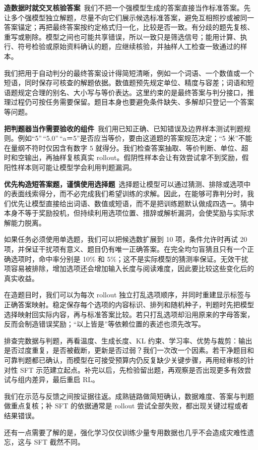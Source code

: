 \textbf{造数据时就交叉核验答案}~我们不把一个强模型生成的答案直接当作标准答案。先让多个强模型独立解题，尽量不向它们展示候选标准答案，避免互相照抄或被同一答案锚定；再把最终答案按约定格式归一化，比较是否一致。有分歧的题先复核、重写或剔除。模型之间也可能共享错误，所以一致只是筛选信号；能用计算、执行、符号检验或原始资料确认的题，应继续核验，并抽样人工检查一致通过的样本。

我们把用于自动判分的最终答案设计得简短清晰，例如一个词语、一个数值或一个短语，同时保存可核查的解题依据。数值题预先规定单位、精度与容差；词语和短语题规定合理的别名、大小写与等价表达。这里约束的是最终答案与判分接口，推理过程仍可按任务需要保留。题目本身也要避免条件缺失、多解却只登记一个答案等问题。

\textbf{把判题器当作需要验收的组件}~我们用已知正确、已知错误及边界样本测试判题规则。例如``5''\,``5.0''\,``a＝5''是否应当等价，要由这道题的答案规范决定；``5 米''不能在量纲不符时仅因含有数字 5 就得分。我们检查答案抽取、等价判断、单位、超时和空输出，再抽样复核真实 rollout。假阴性样本会让有效尝试拿不到奖励，假阳性样本则可能让模型学会利用判题漏洞。

\textbf{优先构造短答案题，谨慎使用选择题}~选择题让模型可以通过猜测、排除或选项中的表面线索得分，而不必完成我们希望训练的求解。因此，在能够可靠判分时，我们优先让模型直接给出词语、数值或短语，而不是把训练题默认做成四选一。猜中本身不等于奖励投机，但持续利用选项位置、措辞或解析漏洞，会使奖励与实际求解能力脱离。

如果任务必须使用单选题，我们可以把候选数扩展到 10 项，条件允许时再试 20 项，并保证干扰项有意义、题目仍有唯一正确答案。在完全均匀盲猜且只有一个正确选项时，命中率分别是 10\% 和 5\%；这不是实际模型的猜测率保证。无效干扰项容易被排除，增加选项还会增加输入长度与阅读难度，因此要比较这些变化后的真实收益。

在造题目时，我们可以为每次 rollout 独立打乱选项顺序，并同时重建显示标签与正确答案映射。稳定保存每个选项的内容标识、排列和随机种子，判题时先把模型选择映射回实际内容，再与标准答案比较。若只打乱选项却沿用原来的字母答案，反而会制造错误奖励；``以上皆是''等依赖位置的表述也须先改写。

排查完数据与判题，再看温度、生成长度、KL 约束、学习率、优势与裁剪：输出是否过度重复，是否被截断，更新是否过弱？我们一次改一个因素。若干净题目和可靠判题都已确认，而模型在可接受预算内仍反复缺少关键步骤，再用经审核的针对性 SFT 示范建立起点。补完以后，先检验留出题，再观察是否出现更多有效尝试与组内差异，最后重启 RL。

我们在示范与反馈之间按证据往返。成熟链路做简短确认，数据难度、答案与判题做重点复核；补 SFT 的依据通常是 rollout 尝试全部失败，都出现关键过程或者结果错误。

还有一点需要了解的是，强化学习仅仅训练少量专用数据也几乎不会造成灾难性遗忘，这与 SFT 截然不同。